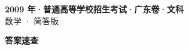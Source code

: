 \documentclass[zihao=-4, a4paper]{ctexart}
\begin{document}
\begin{center}
  {\Large\bfseries 2009 年·普通高等学校招生考试·广东卷·文科}\\[4pt]
  {\large 数学 · 简答版}
\end{center}
\medskip
{}

\clearpage
{}
\begin{center}{\Large\bfseries 答案速查}\end{center}
\medskip

\end{document}
